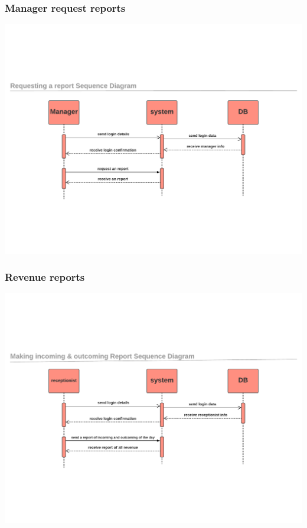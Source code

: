 \documentclass[../Psychological_system_web_application.tex]{subfiles}
\begin{document}
							
							
						\subsubsection{Manager request reports}
							
								\includegraphics[width=\textwidth ,height=0.4\textheight ,scale=4]{Diagrams/sequence_diagram/manager_requesting_report.pdf}
								\label{FIG:2.13}
							
							
							
						\subsubsection{Revenue reports}
							
								\includegraphics[width=\textwidth ,height=0.4\textheight ,scale=4]{Diagrams/sequence_diagram/report_of_revenue.pdf}
								\label{FIG:2.14}
							
\end{document}
